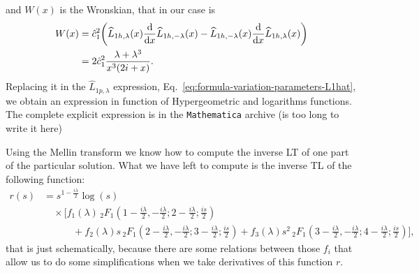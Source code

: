 \documentclass[%
 aip,
 jmp,%
 amsmath,amssymb,
 reprint,%
]{revtex4-2}
\begin{document}
and $W(x)$ is the Wronskian, that in our case is
\begin{equation}
\begin{aligned}
    W(x) &= \hat{c}_1^2 \qty(\widehat{L}_{1h,\lambda}(x)\dv{x}\widehat{L}_{1h,-\lambda}(x) - \widehat{L}_{1h,-\lambda}(x)\dv{x}\widehat{L}_{1h,\lambda}(x))\\
    &=2{\hat{c}_1}^2\frac{\lambda + \lambda^3}{x^3(2i + x)}.
\end{aligned}
\end{equation}
Replacing it in the $\widehat{L}_{1p,\lambda}$ expression, Eq.~\eqref{eq:formula-variation-parameters-L1hat}, we obtain an expression in function of Hypergeometric and logarithms functions. The complete explicit expression is in the \texttt{Mathematica} archive (is too long to write it here)

Using the Mellin transform we know how to compute the inverse LT of one part of the particular solution. What we have left to compute is the inverse TL of the following function:
\begin{equation*}
    \boxed{\begin{aligned}
        r(s) &=  s^{1-\frac{i \lambda }{2}}\log (s) \\
        &\quad \times\Bigg[ f_1(\lambda)\, _2F_1\left(1-\frac{i \lambda }{2},-\frac{i \lambda}{2} ;2-\frac{i \lambda }{2};\frac{i s}{2}\right)\\
        &\qquad\quad + f_2(\lambda) s  \, _2F_1\left(2-\frac{i \lambda }{2},-\frac{i \lambda}{2};3-\frac{i \lambda }{2};\frac{i s}{2}\right)+f_3(\lambda) s^2 \, _2F_1\left(3-\frac{i \lambda }{2},-\frac{i \lambda }{2} ;4-\frac{i \lambda }{2};\frac{i s}{2}\right)\Bigg],
    \end{aligned}}
\end{equation*}
that is just schematically, because there are some relations between those $f_i$ that allow us to do some simplifications when we take derivatives of this function $r$.
\end{document}
